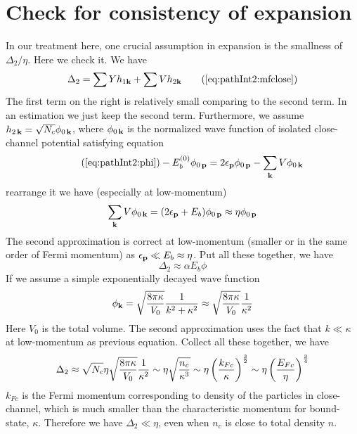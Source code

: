 \section{Check for consistency of expansion\label{sec:pathApp:consistency}}
In our treatment here, one crucial assumption in expansion is the smallness of $\Delta_{2}/\eta$.  Here we check it.  We have 
\begin{equation}
\Delta_{2}=\sum{}Yh_{1\vk}+\sum{}Vh_{2\vk}\tag{\ref{eq:pathInt2:mfclose}}
\end{equation}
The first term on the right is relatively small comparing to the second term.  In an estimation we just keep the second term.  Furthermore,  we assume $h_{2\,\mathbf{k}}=\sqrt{N_{c}}\phi_{0\,\mathbf{k}}$, where $\phi_{0\,\mathbf{k}}$ is the normalized wave function of isolated close-channel potential satisfying \sch equation
\begin{equation}\tag{\ref{eq:pathInt2:phi}}
-E_{b}^{(0)}\phi_{0\,\vp}=2\epsilon_{\vp}\phi_{0\,\vp}-\sum_{\vk}V \phi_{0\,\vk}
\end{equation}
rearrange it we have (especially at low-momentum)
\begin{equation*}
\sum_{\mathbf{k}}V \phi_{0\,\mathbf{k}}=(2\epsilon_{\mathbf{p}}+E_{b})\phi_{0\,\mathbf{p}}\approx{\eta}\phi_{0\,\mathbf{p}}
\end{equation*}
The second approximation is correct at low-momentum (smaller or in the same order of Fermi momentum) as $\epsilon_{\mathbf{p}}\ll{}E_{b}\approx\eta$.  Put all these together, we have
\begin{equation*}
\Delta_{2}\approx\alpha{}E_{b}\phi
\end{equation*}
If we assume a simple exponentially decayed wave function
\begin{equation}\label{eq:pathInt2:phi2body}
\phi_{\mathbf{k}}=\sqrt{\frac{8\pi\kappa}{V_{0}}}\frac{1}{k^{2}+\kappa^{2}}\approx\sqrt{\frac{8\pi\kappa}{V_{0}}}\frac{1}{\kappa^{2}}
\end{equation}
Here  $V_{0}$ is the total volume.  The second approximation uses the fact that $k\ll\kappa$ at low-momentum as previous equation.  Collect all these together, we have
\begin{equation}
\Delta_{2}\approx\sqrt{N_{c}}\eta\sqrt{\frac{8\pi\kappa}{V_{0}}}\frac{1}{\kappa^{2}}
\sim\eta\sqrt\frac{n_{c}}{\kappa^{3}}
\sim\eta\left(\frac{k_{Fc}}{\kappa}\right)^{\frac{3}{2}}
\sim\eta\left(\frac{E_{Fc}}{\eta}\right)^{\frac{3}{4}}
\end{equation}
$k_{Fc}$ is the Fermi momentum corresponding to density of the particles in close-channel, which is much smaller than the characteristic momentum for bound-state, $\kappa$.   Therefore we have $\Delta_{2}\ll\eta$, even when $n_{c}$ is close to total density $n$. 

